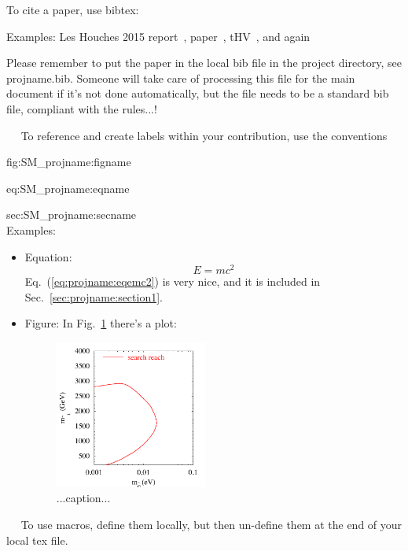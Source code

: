 To cite a paper, use bibtex:

Examples: Les Houches 2015 report~\cite{Badger:2016bpw},
paper~\cite{Aaboud:2016ffv}, tHV~\cite{'tHooft:1972fi}, and again~\cite{'tHooft:1972fi}

Please remember to put the paper in the local bib file in the project
directory, see projname.bib. Someone will take care of processing this
file for the main document if it's not done automatically, but the
file needs to be a standard bib file, compliant with the rules...!

~\newline~
To reference and create labels within your contribution, use the conventions

fig:SM\_projname:figname

eq:SM\_projname:eqname

sec:SM\_projname:secname\\
Examples:
\begin{itemize}
\item Equation:
  \begin{equation}
    E = m c^2
    \label{eq:projname:eqemc2}
  \end{equation}
  Eq.~(\ref{eq:projname:eqemc2}) is very nice, and it is included in Sec.~\ref{sec:projname:section1}.
\item Figure: In Fig.~\ref{fig:projname:plot1} there's a plot:
\begin{figure}[htbp]
  \begin{center}
    \includegraphics[width=5cm]{Fig1.pdf}
    \caption{...caption...}
    \label{fig:projname:plot1}
  \end{center}
\end{figure}
\end{itemize}
~\newline~
To use macros, define them locally, but then un-define them at the end of your local tex file.

